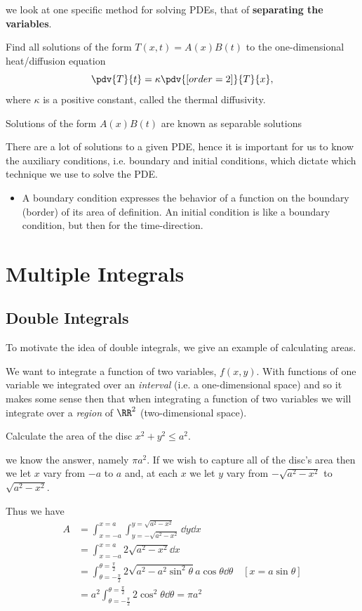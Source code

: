 we look at one specific method for solving PDEs, that of \textbf{separating the variables}.

\begin{exercise}{}{}
Find all solutions of the form $T(x,t)=A(x)B(t)$ to the one-dimensional heat/diffusion equation
\[ \pdv{T}{t}=\kappa\pdv{[order={2}]}{T}{x}, \]
where $\kappa$ is a positive constant, called the thermal diffusivity.
\end{exercise}

Solutions of the form $A(x)B(t)$ are known as separable solutions

There are a lot of solutions to a given PDE, hence it is important for us to know the auxiliary conditions, i.e. boundary and initial conditions, which dictate which technique we use to solve the PDE.
\begin{itemize}
\item A boundary condition expresses the behavior of a function on the boundary (border) of its area of definition. An initial condition is like a boundary condition, but then for the time-direction.
\end{itemize}
\pagebreak

\chapter{Multiple Integrals}
\section{Double Integrals}
To motivate the idea of double integrals, we give an example of calculating areas.

We want to integrate a function of two variables, $f(x,y)$. With functions of one variable we integrated over an \emph{interval} (i.e. a one-dimensional space) and so it makes some sense then that when integrating a function of two variables we will integrate over a \emph{region} of $\RR^2$ (two-dimensional space). 

\begin{exercise}{}{}
Calculate the area of the disc $x^2+y^2\le a^2$.
\end{exercise}

\begin{solution}
we know the answer, namely $\pi a^2$. If we wish to capture all of the disc's area then we let $x$ vary from $-a$ to $a$ and, at each $x$ we let $y$ vary from $-\sqrt{a^2-x^2}$ to $\sqrt{a^2-x^2}$.

Thus we have
\begin{align*}
A &= \int_{x=-a}^{x=a}\int_{y=-\sqrt{a^2-x^2}}^{y=\sqrt{a^2-x^2}}\dd{y}\dd{x} \\
&= \int_{x=-a}^{x=a}2\sqrt{a^2-x^2}\dd{x} \\
&= \int_{\theta=-\frac{\pi}{2}}^{\theta=\frac{\pi}{2}}2\sqrt{a^2-a^2\sin^2\theta}a\cos\theta\dd{\theta} \quad [x=a\sin\theta] \\
&= a^2\int_{\theta=-\frac{\pi}{2}}^{\theta=\frac{\pi}{2}}2\cos^2\theta\dd{\theta}=\pi a^2
\end{align*}
\end{solution}


